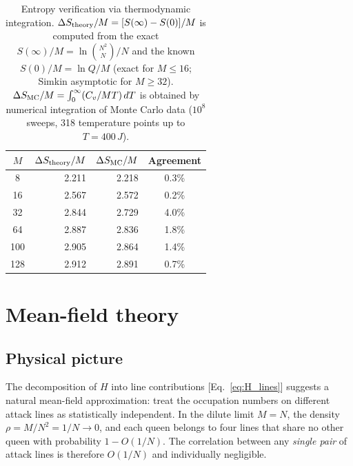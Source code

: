 \documentclass[aps, pre, reprint, amsmath, amssymb, superscriptaddress, floatfix]{revtex4-2}
\begin{document}
\begin{table}[b]
  \caption{Entropy verification via thermodynamic integration.
  $\Delta S_{\rm theory}/M = [S(\infty) - S(0)]/M$ is computed from
  the exact $S(\infty)/M = \ln\binom{N^2}{N}/N$ and the known
  $S(0)/M = \ln Q/M$ (exact for $M \le 16$; Simkin asymptotic for
  $M \ge 32$).  $\Delta S_{\rm MC}/M = \int_0^\infty (C_v/MT)\,dT$
  is obtained by numerical integration of Monte Carlo data
  ($10^8$ sweeps, 318 temperature points up to $T = 400\,J$).}
  \label{tab:entropy_check}
  \begin{ruledtabular}
  \begin{tabular}{cD{.}{.}{3}D{.}{.}{3}c}
    $M$ & 
    & 
    & Agreement \\
       & 2.211 & 2.218 & 0.3\% \\
    16  & 2.567 & 2.572 & 0.2\% \\
    32  & 2.844 & 2.729 & 4.0\% \\
    64  & 2.887 & 2.836 & 1.8\% \\
    100 & 2.905 & 2.864 & 1.4\% \\
    128 & 2.912 & 2.891 & 0.7\% \\
  \end{tabular}
  \end{ruledtabular}
\end{table}

\section{Mean-field theory}
\label{sec:mf}

\subsection{Physical picture}

The decomposition of $H$ into line contributions
[Eq.~\eqref{eq:H_lines}] suggests a natural mean-field
approximation: treat the occupation numbers on different attack lines
as statistically independent.  In the dilute limit $M = N$, the
density $\rho = M/N^2 = 1/N \to 0$, and each queen belongs to four
lines that share no other queen with probability $1 - O(1/N)$.  The
correlation between any \emph{single pair} of attack lines is
therefore $O(1/N)$ and individually negligible.
\end{document}

